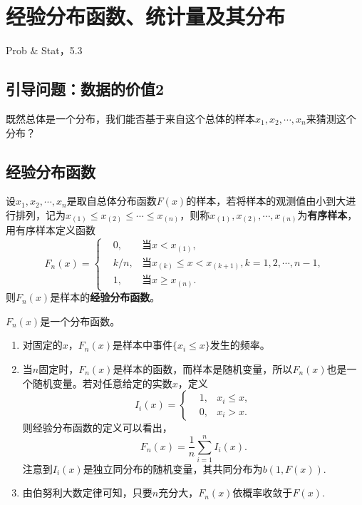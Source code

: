 \chapter{经验分布函数、统计量及其分布}
\begin{introduction}
  \item Prob $\&$ Stat，5.3
\end{introduction}
\section{引导问题：数据的价值2}
\begin{problem}
    既然总体是一个分布，我们能否基于来自这个总体的样本$x_{1},x_{2},\cdots,x_{n}$来猜测这个分布？
\end{problem}
\begin{note}
\vspace{3cm}
\end{note}
\section{经验分布函数}
\begin{definition}[经验分布函数]
    设$x_1,x_2,\cdots,x_n$是取自总体分布函数$F(x)$的样本，若将样本的观测值由小到大进行排列，记为$x_{(1)}\leq x_{(2)}\leq \cdots\leq x_{(n)}$，则称$x_{(1)}, x_{(2)}, \cdots, x_{(n)}$为\textbf{有序样本}，用有序样本定义函数
    $$
    F_n(x) = \left\{
    \begin{aligned}
        &0, &\text{当$x<x_{(1)}$},\\
        & k/n, & \text{当$x_{(k)}\leq x<x_{(k+1)},k=1,2,\cdots,n-1$},\\
        &1, &\text{当$x\geq x_{(n)}$}.
    \end{aligned}
    \right.
    $$
    则$F_n(x)$是样本的\textbf{经验分布函数}。
\end{definition}
\begin{note}
    $F_n(x)$是一个分布函数。\\
    \vspace{5cm}
\end{note}

\begin{remark}
\begin{enumerate}
    \item 对固定的$x$，$F_n(x)$是样本中事件$\{x_i\leq x\}$发生的频率。 
    \item 当$n$固定时，$F_n(x)$是样本的函数，而样本是随机变量，所以$F_n(x)$也是一个随机变量。若对任意给定的实数$x$，定义
    $$
   I_i(x) = \left\{
   \begin{aligned}
       & 1, & x_i \leq x,\\
       & 0, & x_i > x.
   \end{aligned}
   \right.
    $$
    则经验分布函数的定义可以看出，$$
    F_n(x)= \frac{1}{n}\sum_{i=1}^n I_i(x).
    $$
    注意到$I_i(x)$是独立同分布的随机变量，其共同分布为$b(1,F(x))$.
    \item 由伯努利大数定律可知，只要$n$充分大，$F_n(x)$依概率收敛于$F(x)$.
\end{enumerate}    
\end{remark}

